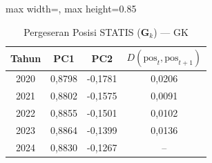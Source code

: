 \begin{table}[H]
\centering
\caption{Pergeseran Posisi STATIS ($\mathbf{G}_k$) --- GK} \label{tab:app1jarak_statis_loading_gk}
\begin{adjustbox}{max width=\textwidth, max height=0.85\textheight}
\begin{tabular}{|c|c|c|c|}
\hline
\textbf{Tahun} & \textbf{PC1} & \textbf{PC2} & \textbf{$D(\text{pos}_t, \text{pos}_{t+1})$} \\
\hline
2020 & 0,8798 & -0,1781 & 0,0206 \\
2021 & 0,8802 & -0,1575 & 0,0091 \\
2022 & 0,8855 & -0,1501 & 0,0102 \\
2023 & 0,8864 & -0,1399 & 0,0136 \\
2024 & 0,8830 & -0,1267 & -- \\
\hline
\end{tabular}
\end{adjustbox}
\end{table}